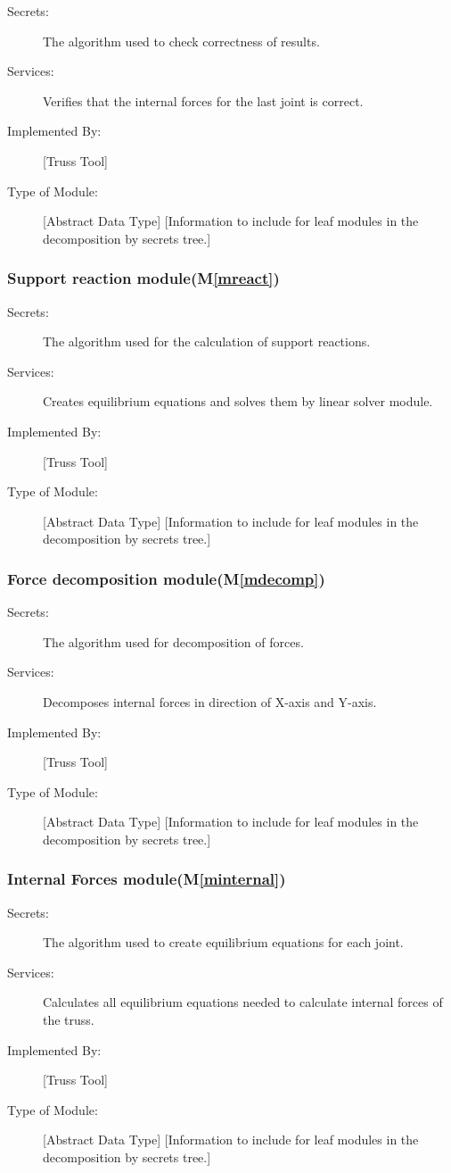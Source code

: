 \documentclass[12pt, titlepage]{article}
\newcommand{\mref}[1]{M\ref{#1}}
\begin{document}
\begin{description}
\item[Secrets:]The algorithm used to check correctness of results.
\item[Services:] Verifies that the internal forces for the last joint is correct.
\item[Implemented By:] [Truss Tool]
\item[Type of Module:] [Abstract Data Type]
  [Information to include for leaf modules in the decomposition by secrets tree.]
\end{description}
\subsubsection{Support reaction module(\mref{mreact})}

\begin{description}
\item[Secrets:]The algorithm used for the calculation of support reactions.
\item[Services:] Creates equilibrium equations  and solves them by linear solver module.
\item[Implemented By:] [Truss Tool]
\item[Type of Module:] [Abstract Data Type]
  [Information to include for leaf modules in the decomposition by secrets tree.]
\end{description}
\subsubsection{Force decomposition module(\mref{mdecomp})}

\begin{description}
\item[Secrets:]The algorithm used for decomposition of forces.
\item[Services:] Decomposes internal forces in direction of X-axis and Y-axis.
\item[Implemented By:] [Truss Tool]
\item[Type of Module:] [Abstract Data Type]
  [Information to include for leaf modules in the decomposition by secrets tree.]
\end{description}
\subsubsection{Internal Forces module(\mref{minternal})}

\begin{description}
\item[Secrets:]The algorithm used to create equilibrium equations for each joint.
\item[Services:] Calculates all equilibrium equations needed to calculate internal forces of the truss. 
\item[Implemented By:] [Truss Tool]
\item[Type of Module:] [Abstract Data Type]
  [Information to include for leaf modules in the decomposition by secrets tree.]
\end{description}
\end{document}

